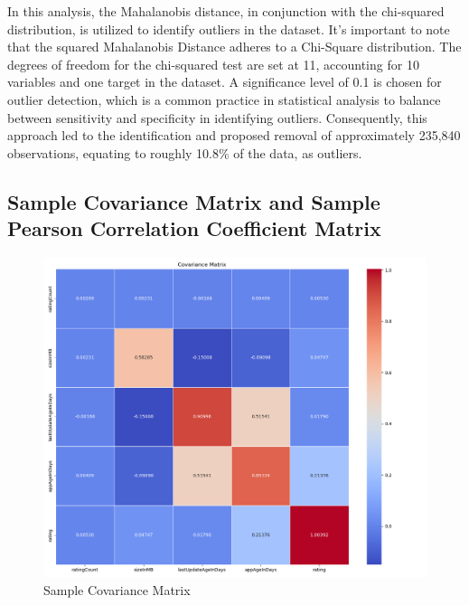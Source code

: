 In this analysis, the Mahalanobis distance, in conjunction with the chi-squared distribution, is utilized to identify outliers in the dataset. It's important to note that the squared Mahalanobis Distance adheres to a Chi-Square distribution. The degrees of freedom for the chi-squared test are set at 11, accounting for 10 variables and one target in the dataset. A significance level of 0.1 is chosen for outlier detection, which is a common practice in statistical analysis to balance between sensitivity and specificity in identifying outliers. Consequently, this approach led to the identification and proposed removal of approximately 235,840 observations, equating to roughly 10.8\% of the data, as outliers.

\subsection{Sample Covariance Matrix and Sample Pearson Correlation Coefficient Matrix}

\begin{figure}[h]
\centering
\includegraphics[width=\textwidth]{docs//assets/cov.png}
\caption{Sample Covariance Matrix}
\end{figure}

